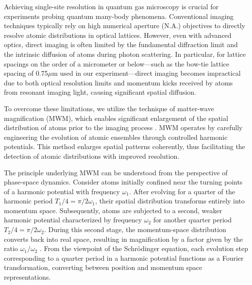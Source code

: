 
Achieving single-site resolution in quantum gas microscopy is crucial for experiments probing quantum many-body phenomena. Conventional imaging techniques typically rely on high numerical aperture (N.A.) objectives to directly resolve atomic distributions in optical lattices. However, even with advanced optics, direct imaging is often limited by the fundamental diffraction limit and the intrinsic diffusion of atoms during photon scattering. In particular, for lattice spacings on the order of a micrometer or below—such as the bow-tie lattice spacing of 0.75$\mu$m used in our experiment—direct imaging becomes impractical due to both optical resolution limits and momentum kicks received by atoms from resonant imaging light, causing significant spatial diffusion.

To overcome these limitations, we utilize the technique of matter-wave magnification (MWM), which enables significant enlargement of the spatial distribution of atoms prior to the imaging process \cite{huang_construction_2024}. MWM operates by carefully engineering the evolution of atomic ensembles through controlled harmonic potentials. This method enlarges spatial patterns coherently, thus facilitating the detection of atomic distributions with improved resolution.

The principle underlying MWM can be understood from the perspective of phase-space dynamics. Consider atoms initially confined near the turning points of a harmonic potential with frequency $\omega_1$. After evolving for a quarter of the harmonic period $T_1/4=\pi/2\omega_1$, their spatial distribution transforms entirely into momentum space. Subsequently, atoms are subjected to a second, weaker harmonic potential characterized by frequency $\omega_2$ for another quarter period $T_2/4=\pi/2\omega_2$. During this second stage, the momentum-space distribution converts back into real space, resulting in magnification by a factor given by the ratio $\omega_1/\omega_2$ \cite{huang_construction_2024}. From the viewpoint of the Schrödinger equation, each evolution step corresponding to a quarter period in a harmonic potential functions as a Fourier transformation, converting between position and momentum space representations.


